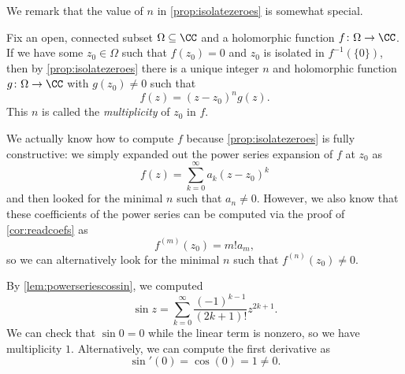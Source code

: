 We remark that the value of $n$ in \autoref{prop:isolatezeroes} is somewhat special.
\begin{definition}[Multiplicity]
	Fix an open, connected subset $\Omega\subseteq\CC$ and a holomorphic function $f\colon\Omega \to\CC$. If we have some $z_0\in\Omega$ such that $f(z_0)=0$ and $z_0$ is isolated in $f^{-1}(\{0\})$, then by \autoref{prop:isolatezeroes} there is a unique integer $n$ and holomorphic function $g\colon\Omega \to\CC$ with $g(z_0)\ne0$ such that
	\[f(z)=(z-z_0)^ng(z).\]
	This $n$ is called the \textit{multiplicity} of $z_0$ in $f$.
\end{definition}
We actually know how to compute $f$ because \autoref{prop:isolatezeroes} is fully constructive: we simply expanded out the power series expansion of $f$ at $z_0$ as
\[f(z)=\sum_{k=0}^\infty a_k(z-z_0)^k\]
and then looked for the minimal $n$ such that $a_n\ne0$. However, we also know that these coefficients of the power series can be computed via the proof of \autoref{cor:readcoefs} as
\[f^{(m)}(z_0)=m!a_m,\]
so we can alternatively look for the minimal $n$ such that $f^{(n)}(z_0)\ne0$.
\begin{example}
	By \autoref{lem:powerseriescossin}, we computed
	\[\sin z=\sum_{k=0}^\infty\frac{(-1)^{k-1}}{(2k+1)!}z^{2k+1}.\]
	We can check that $\sin0=0$ while the linear term is nonzero, so we have multiplicity $1$. Alternatively, we can compute the first derivative as
	\[\sin'(0)=\cos(0)=1\ne0.\]
\end{example}

